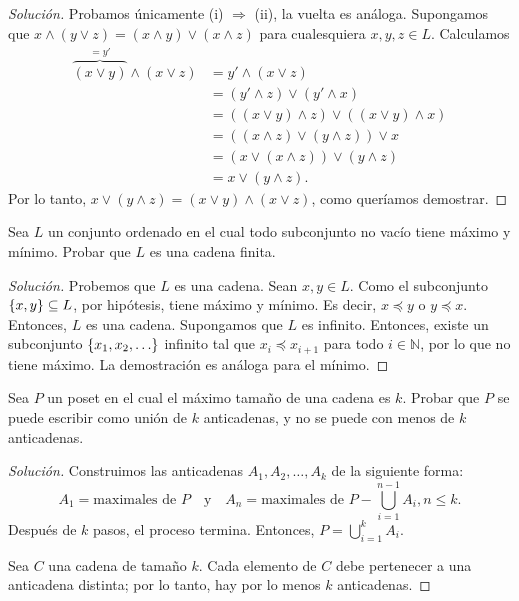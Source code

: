 \begin{proof}[Solución]
    Probamos únicamente (i) $\Rightarrow$ (ii), la vuelta es análoga. Supongamos que $x \wedge (y \vee z) = (x \wedge y) \vee (x \wedge z)$ para cualesquiera $x, y, z \in L$. Calculamos
    \begin{align*}  
        \overbrace{(x \vee y)}^{= y'} \wedge (x \vee z) &=  y' \wedge (x \vee z) \\
            &= (y' \wedge z) \vee (y' \wedge x) \\
            &= ((x \vee y) \wedge z) \vee ((x \vee y) \wedge x) \\
            &= ((x \wedge z) \vee (y \wedge z)) \vee x \\
            &= (x \vee (x \wedge z)) \vee (y \wedge z) \\
            &= x \vee (y \wedge z).
    \end{align*}
    Por lo tanto, $x \vee (y \wedge z) = (x \vee y) \wedge (x \vee z)$, como queríamos demostrar.
\end{proof}

\begin{exercise}[6]
    Sea $L$ un conjunto ordenado en el cual todo subconjunto no vacío tiene máximo y mínimo. Probar que $L$ es una cadena finita.
\end{exercise}

\begin{proof}[Solución]
    Probemos que $L$ es una cadena. Sean $x, y \in L$. Como el subconjunto $\left\{  x, y  \right\} \subseteq L$, por hipótesis, tiene máximo y mínimo. Es decir, $x \preceq y$ o $y \preceq x$. Entonces, $L$ es una cadena. Supongamos que $L$ es infinito. Entonces, existe un subconjunto $\set{ x_{1}, x_{2}, \dots }$ infinito tal que $x_i \preceq x_{i+1}$ para todo $i \in \mathbb{N}$, por lo que no tiene máximo. La demostración es análoga para el mínimo.
\end{proof}

\begin{exercise}[7]
    Sea $P$ un poset en el cual el máximo tamaño de una cadena es $k$. Probar que $P$ se puede escribir como unión de $k$ anticadenas, y no se puede con menos de $k$ anticadenas.
\end{exercise}

\begin{proof}[Solución]
    Construimos las anticadenas $A_1, A_2, \dots, A_k$ de la siguiente forma:
    $$
        A_1 = \text{maximales de } P \quad \text{y} \quad A_n =  \text{maximales de } P  - \bigcup_{i = 1}^{n-1} A_i, n \leq k.
    $$
    Después de $k$ pasos, el proceso termina. Entonces, $P = \bigcup_{i = 1}^{k} A_i$.

    Sea $C$ una cadena de tamaño $k$. Cada elemento de $C$ debe pertenecer a una anticadena distinta; por lo tanto, hay por lo menos $k$ anticadenas.
\end{proof}

